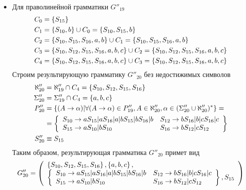 \begin{itemize}
\begin{align*}
	      \end{align*}
	\item Для праволинейной грамматики \(G''_{19}\)
	      \begin{align*}
		      C_{0} & = \left\{S_{15}\right\}                                                                                             \\
		      C_{1} & = \left\{S_{10}, b\right\} \cup C_{0} = \left\{S_{10}, S_{15}, b\right\}                                                     \\
		      C_{2} & = \left\{S_{10}, S_{15}, S_{16}, a, b\right\} \cup C_{1} = \left\{S_{10}, S_{15}, S_{16}, a, b\right\}                       \\
		      C_{3} & = \left\{S_{10}, S_{12}, S_{15}, S_{16}, a, b, c\right\} \cup C_{2} = \left\{S_{10}, S_{12}, S_{15}, S_{16}, a, b, c\right\} \\
		      C_{4} & = \left\{S_{10}, S_{12}, S_{15}, S_{16}, a, b, c\right\} \cup C_{3} = \left\{S_{10}, S_{12}, S_{15}, S_{16}, a, b, c\right\}
	      \end{align*}
	      Строим результирующую грамматику \(G''_{20}\) без недостижимых символов
	      \begin{align*}
		      \aleph''_{20} & = \aleph''_{19} \cap C_{4} = \left\{S_{10}, S_{12}, S_{15}, S_{16}\right\}                                                                \\
		      \Sigma''_{20} & = \Sigma''_{19} \cap C_{4} = \left\{a, b, c\right\}                                                                                       \\
		      P''_{20}      & = \left\{(A \to \alpha) | \forall (A\to\alpha)\in P''_{19},A\in \aleph''_{20}, \alpha \in (\Sigma''_{20} \cup  \aleph''_{20})^*\right\} = \\
		                    & = \left\{\begin{array}{ll}
				                             S_{10} \to aS_{15}|aS_{16}|a|bS_{15}|bS_{16}|b & S_{12} \to bS_{16}|b|cS_{16}|c \\
				                             S_{15} \to aS_{10}|bS_{10}                     & S_{16} \to bS_{12}|cS_{12}
			                             \end{array}\right\}                                           \\
		      S''_{20}      & \equiv S_{15}
	      \end{align*}
	      Таким образом, результирующая грамматика \(G''_{20}\) примет вид
	      \begin{align*}
		      G''_{20} = \grammatics{S_{10}, S_{12}, S_{15}, S_{16}}{\cbr{a, b, c}}{%
		      S_{10} \to aS_{15}|aS_{16}|a|bS_{15}|bS_{16}|b & S_{12} \to bS_{16}|b|cS_{16}|c \\
		      S_{15} \to aS_{10}|bS_{10}                     & S_{16} \to bS_{12}|cS_{12}
		      }{S_{15}}
	      \end{align*}
\end{itemize}
